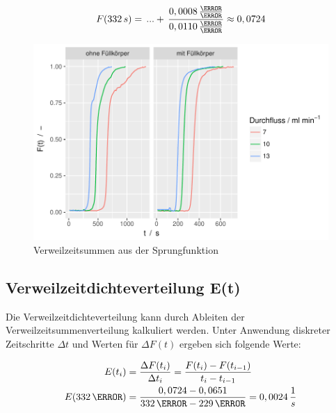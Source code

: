 \documentclass[12pt,liststotoc]{report}
\begin{document}
\begin{equation}
F(332\,s)=\,...+\,\frac{ 0,0008\,\frac{\mole}{\litre}}{ 0,0110\,\frac{\mole}{\litre}} \approx 0,0724 \notag
\end{equation}


\begin{figure}[H]
\centering
\includegraphics[width=1\textwidth]{Graphics/F_step.pdf}
\caption[Verweilzeitsumme Sprungfunktion]{Verweilzeitsummen aus der Sprungfunktion}
\label{summe_step}
\end{figure}
\noindent

\subsection{Verweilzeitdichteverteilung E(t)}

Die Verweilzeitdichteverteilung kann durch Ableiten der Verweilzeitsummenverteilung kalkuliert werden. Unter Anwendung diskreter Zeitschritte $\Delta t$ und Werten für $\Delta F (t)$ ergeben sich folgende Werte:

\begin{align}
E(t_i)=&\; \frac{\Delta F(t_i)}{\Delta t_i}= \frac{F(t_{i})-F(t_{i-1})}{t_i-t_{i-1}}\\
E(332\,\s)=&\; \frac{0,0724
 - 0,0651}{332\,\s - 229\,\s} = 0,0024
\,\frac{1}{s}\notag
\end{align}
\end{document}
